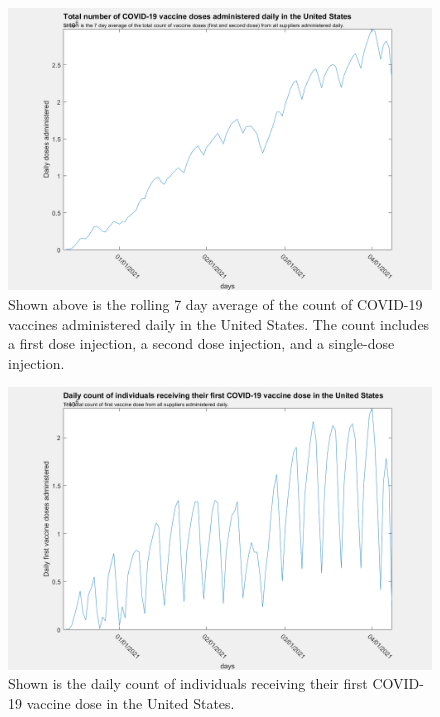 \documentclass[twoside]{article}
\begin{document}
\begin{multicols}{2}
\begin{figure}[H]
	\includegraphics[width=\linewidth]{images/usa_daily_total_doses_processed.png}
	\caption{Shown above is the rolling 7 day average of the count of COVID-19 vaccines administered daily in the United States. The count includes a first dose injection, a second dose injection, and a single-dose injection.}
	\label{fig:images/usa_daily_total_doses_processedLabel}
\end{figure}

\begin{figure}[H]
	\includegraphics[width=\linewidth]{images/usa_daily_first_doses_unprocessed.png}
	\caption{Shown is the daily count of individuals receiving their first COVID-19 vaccine dose in the United States. }
	\label{fig:images/usa_daily_first_doses_unprocessedLabel}
\end{figure}


\end{multicols}
\end{document}
